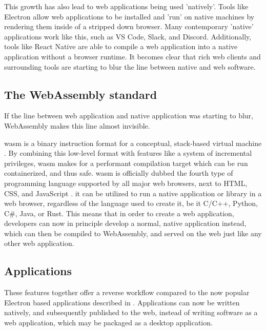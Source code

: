 This growth has also lead to web applications being used 'natively'. 
Tools like Electron \citep{contributors_electron_2022} allow web applications to be installed and 'run' on native machines by rendering them inside of a stripped down browser. 
Many contemporary 'native' applications work like this, such as VS Code, Slack, and Discord.
Additionally, tools like React Native \citep{contributors_react_2022} are able to compile a web application into a native application without a browser runtime.  
It becomes clear that rich web clients and surrounding tools are starting to blur the line between native and web software.

\subsection{The WebAssembly standard}
\label{sec:background-wasm}

If the line between web application and native application was starting to blur, 
WebAssembly makes this line almost invisible. 

\ac{wasm} is a binary instruction format for a conceptual, stack-based virtual machine \citep{contributors_webassembly_2022}.
By combining this low-level format with features like a system of incremental privileges, \ac{wasm} makes for a performant compilation target which can be run containerized, and thus safe.
\ac{wasm} is officially dubbed the fourth type of programming language supported by all major web browsers, next to HTML, CSS, and JavaScript \citep{w3c_world_2019}.
it can be utilized to run a native application or library in a web browser, regardless of the language used to create it, be it C/C++, Python, C\#, Java, or Rust. 
This means that in order to create a web application, developers can now in principle develop a normal, native application instead, which can then be compiled to WebAssembly, and served on the web just like any other web application. 

\subsection*{Applications}

These features together offer a reverse workflow compared to the now popular Electron based applications described in .
Applications can now be written natively, and subsequently published to the web, instead of writing software as a web application, which may be packaged as a desktop application. 

